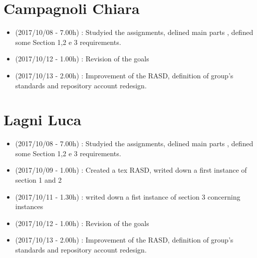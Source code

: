 \documentclass[a4paper]{book}
\begin{document}
\section{Campagnoli Chiara}
\begin{itemize}
\item (2017/10/08 - 7.00h) : Studyied the assignments, delined main parts , defined some Section 1,2 e 3 requirements.
\item (2017/10/12 - 1.00h) : Revision of the goals 
\item (2017/10/13 - 2.00h) : Improvement of the RASD, definition of group's standards and repository account redesign.
\end{itemize}

\section{Lagni Luca}
\begin{itemize}
\item (2017/10/08 - 7.00h) : Studyied the assignments, delined main parts , defined some Section 1,2 e 3 requirements.
\item (2017/10/09 - 1.00h) : Created a tex RASD, writed down a first instance of section 1 and 2
\item (2017/10/11 - 1.30h) : writed down a fist instance of section 3 concerning instances
\item (2017/10/12 - 1.00h) : Revision of the goals 
\item (2017/10/13 - 2.00h) : Improvement of the RASD, definition of group's standards and repository account redesign.
\end{itemize}
\end{document}
